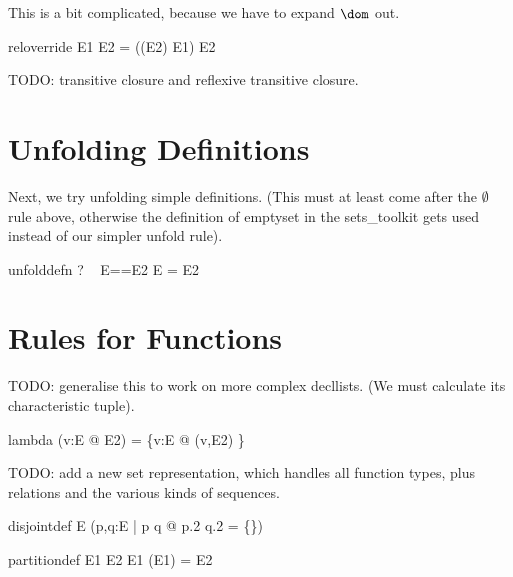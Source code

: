 \documentclass{article}
\begin{document}
This is a bit complicated, because we have to expand $\dom$ out.
\begin{zedrule}{reloverride}
   E1 \oplus E2 = ((\dom E2) \ndres E1) \cup E2
\end{zedrule}

TODO: transitive closure and reflexive transitive closure.


\section{Unfolding Definitions}

Next, we try unfolding simple definitions.
(This must at least come after the $\emptyset$ rule above,
otherwise the definition of emptyset in the sets\_toolkit
gets used instead of our simpler unfold rule).

\begin{zedrule}{unfolddefn}
  \proviso? ~ E==E2
\derives
   E = E2
\end{zedrule}


\section{Rules for Functions}

TODO: generalise this to work on more complex decllists.
(We must calculate its characteristic tuple).
\begin{zedrule}{lambda}
   (\lambda v:E @ E2) = \{v:E @ (v,E2) \}
\end{zedrule}


TODO: add a new set representation, which handles all function types,
plus relations and the various kinds of sequences.

\begin{zedrule}{disjointdef}
   \disjoint E \iff (\forall p,q:E | p \neq q @ p.2 \cap q.2 = \{\})
\end{zedrule}

\begin{zedrule}{partitiondef}
   E1 \partition E2 \iff \disjoint E1 \land \bigcup(\ran E1) = E2
\end{zedrule}
\end{document}
